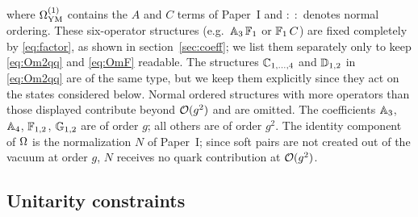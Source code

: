 where $\Omega^{(1)}_{\rm YM}$ contains the $A$ and $C$ terms of Paper~I and $:\;:$ denotes normal
ordering. These six-operator structures (e.g.\ $\mathbb{A}_{3}\,\mathbb{F}_{1}$ or $\mathbb{F}_{1}\,C$) are fixed
completely by \eqref{eq:factor}, as shown in section~\ref{sec:coeff}; we list them separately
only to keep \eqref{eq:Om2qq} and \eqref{eq:OmF} readable. The structures $\mathbb{C}_{1,\dots,4}$ and
$\mathbb{D}_{1,2}$ in \eqref{eq:Om2qq} are of the same type, but we keep them explicitly since they act
on the states considered below. Normal ordered structures with more operators than those displayed
contribute beyond $\mathcal{O}(g^{2})$ and are omitted. The coefficients $\mathbb{A}_{3}$, $\mathbb{A}_{4}$,
$\mathbb{F}_{1,2}$, $\mathbb{G}_{1,2}$ are of order $g$; all others are of order $g^{2}$. The identity
component of $\Omega$ is the normalization $N$ of Paper~I; since soft pairs are not created out of
the vacuum at order $g$, $N$ receives no quark contribution at $\mathcal{O}(g^{2})$.

\subsection*{Unitarity constraints}
\label{sec:unitarity}

